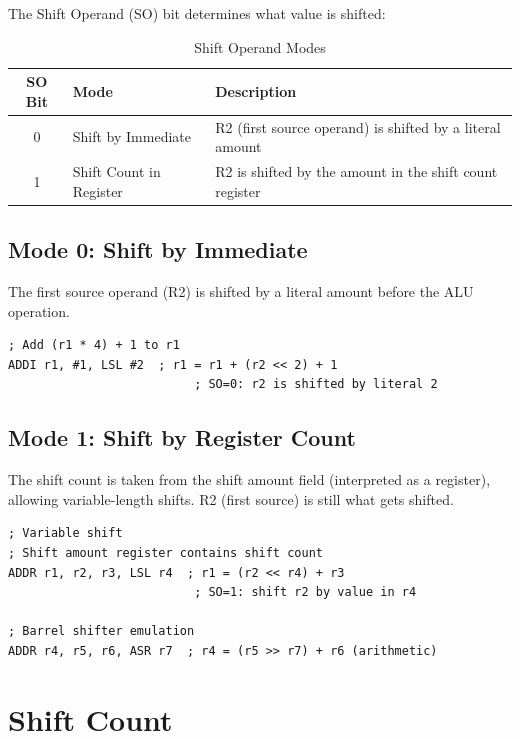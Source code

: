 The Shift Operand (SO) bit determines what value is shifted:

\begin{table}[H]
	\centering
	\begin{tabular}{clp{8cm}}
		\toprule
		\textbf{SO Bit} & \textbf{Mode}           & \textbf{Description}                                     \\
		\midrule
		0               & Shift by Immediate      & R2 (first source operand) is shifted by a literal amount \\
		1               & Shift Count in Register & R2 is shifted by the amount in the shift count register  \\
		\bottomrule
	\end{tabular}
	\caption{Shift Operand Modes}
	\label{tab:shift-operand}
\end{table}

\subsection{Mode 0: Shift by Immediate}

The first source operand (R2) is shifted by a literal amount before the ALU operation.

\begin{lstlisting}
; Add (r1 * 4) + 1 to r1
ADDI r1, #1, LSL #2  ; r1 = r1 + (r2 << 2) + 1
                          ; SO=0: r2 is shifted by literal 2

\end{lstlisting}

\subsection{Mode 1: Shift by Register Count}

The shift count is taken from the shift amount field (interpreted as a register), allowing variable-length shifts. R2
(first source) is still what gets shifted.

\begin{lstlisting}
; Variable shift
; Shift amount register contains shift count
ADDR r1, r2, r3, LSL r4  ; r1 = (r2 << r4) + r3
                          ; SO=1: shift r2 by value in r4

; Barrel shifter emulation
ADDR r4, r5, r6, ASR r7  ; r4 = (r5 >> r7) + r6 (arithmetic)
\end{lstlisting}

\section{Shift Count}

